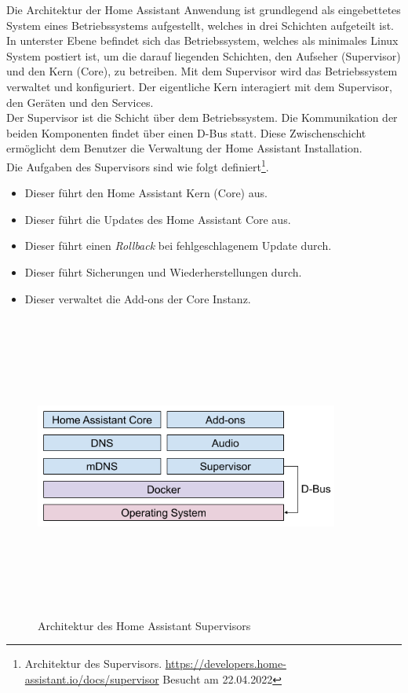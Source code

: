     Die Architektur der Home Assistant Anwendung ist grundlegend als eingebettetes System eines Betriebssystems aufgestellt, welches in 
    drei Schichten aufgeteilt ist. In unterster Ebene befindet sich das Betriebssystem, welches als minimales Linux System postiert 
    ist, um die darauf liegenden Schichten, den Aufseher (Supervisor) und den Kern (Core), zu betreiben. Mit dem Supervisor wird das 
    Betriebssystem verwaltet und konfiguriert. Der eigentliche Kern interagiert mit dem Supervisor, den Geräten und den Services. 
    \\
    \linebreak
    Der Supervisor ist die Schicht über dem Betriebssystem. Die Kommunikation der beiden Komponenten findet über einen D-Bus statt. Diese Zwischenschicht ermöglicht dem 
    Benutzer die Verwaltung der Home Assistant Installation. 
    \\
    Die Aufgaben des Supervisors sind wie folgt 
    definiert\footnote{Architektur des Supervisors. \url{https://developers.home-assistant.io/docs/supervisor} Besucht am 22.04.2022}. 
    \begin{itemize}
        \item Dieser führt den Home Assistant Kern (Core) aus.
        \item Dieser führt die Updates des Home Assistant Core aus.
        \item Dieser führt einen \textit{Rollback} bei fehlgeschlagenem Update durch.
        \item Dieser führt Sicherungen und Wiederherstellungen durch.
        \item Dieser verwaltet die Add-ons der Core Instanz.
    \end{itemize}
    \begin{figure}[hbt!]
        \centering
        \includegraphics[width=10cm,height=10cm,keepaspectratio]{images/ha_architecture_2020.png}
        \caption{Architektur des Home Assistant Supervisors \cite{haos-supervisor}}
        \label{fig:architectureHAOS}
    \end{figure}
